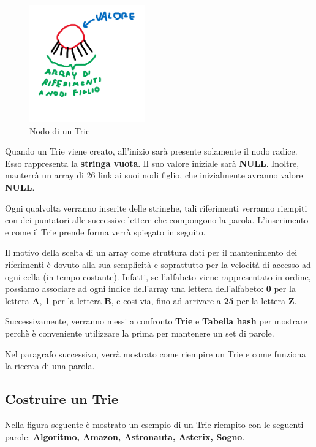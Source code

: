 \documentclass[a4paper, 12pt]{article}
\begin{document}
\begin{figure}[ht!]
    \centering
    \includegraphics[width=5cm]{Images/nodo trie.png}
    \caption{Nodo di un Trie}
    \label{fig:trienode}
\end{figure}

Quando un Trie viene creato, all'inizio sarà presente solamente il nodo radice. Esso rappresenta la \textbf{stringa vuota}. Il suo valore iniziale sarà \textbf{NULL}. Inoltre, manterrà un array di 26 link ai suoi nodi figlio, che inizialmente avranno valore \textbf{NULL}.

Ogni qualvolta verranno inserite delle stringhe, tali riferimenti verranno riempiti con dei puntatori alle successive lettere che compongono la parola. L'inserimento e come il Trie prende forma verrà spiegato in seguito.

Il motivo della scelta di un array come struttura dati per il mantenimento dei riferimenti è dovuto alla sua semplicità e soprattutto per la velocità di accesso ad ogni cella (in tempo costante). Infatti, se l'alfabeto viene rappresentato in ordine, possiamo associare ad ogni indice dell'array una lettera dell'alfabeto: \textbf{0} per la lettera \textbf{A}, \textbf{1} per la lettera \textbf{B}, e cosi via, fino ad arrivare a \textbf{25} per la lettera \textbf{Z}.

Successivamente, verranno messi a confronto \textbf{Trie} e \textbf{Tabella hash} per mostrare perchè è conveniente utilizzare la prima per mantenere un set di parole.

Nel paragrafo successivo, verrà mostrato come riempire un Trie e come funziona la ricerca di una parola.

\subsection{Costruire un Trie}
Nella figura seguente è mostrato un esempio di un Trie riempito con le seguenti parole: \textbf{Algoritmo, Amazon, Astronauta, Asterix, Sogno}.
\end{document}
